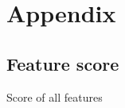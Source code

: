 
\section{Appendix}

\subsection{Feature score}%
\label{sub:full-table-feature}

\begin{table}[H]
    \centering
    \caption{Score of all features}%
    \label{tab:features-all}
    
\end{table}

